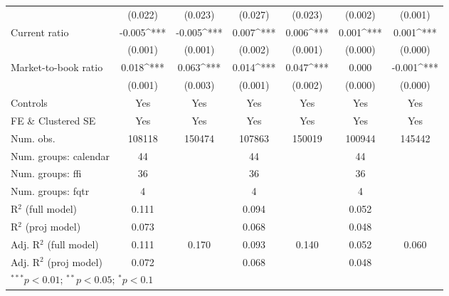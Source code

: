 \begin{sidewaystable}[h]
\begin{center}
{\begin{tabular}{l S[table-format=6.6] S[table-format=6.6] S[table-format=6.6] S[table-format=6.6] S[table-format=6.6] S[table-format=6.6]}
                                    & (0.022)      & (0.023)      & (0.027)      & (0.023)      & (0.002)      & (0.001)      \\
Current ratio                       & -0.005^{***} & -0.005^{***} & 0.007^{***}  & 0.006^{***}  & 0.001^{***}  & 0.001^{***}  \\
                                    & (0.001)      & (0.001)      & (0.002)      & (0.001)      & (0.000)      & (0.000)      \\
Market-to-book ratio                & 0.018^{***}  & 0.063^{***}  & 0.014^{***}  & 0.047^{***}  & 0.000        & -0.001^{***} \\
                                    & (0.001)      & (0.003)      & (0.001)      & (0.002)      & (0.000)      & (0.000)      \\
\midrule
Controls                            & {Yes}        & {Yes}        & {Yes}        & {Yes}        & {Yes}        & {Yes}        \\
FE \& Clustered SE                  & {Yes}        & {Yes}        & {Yes}        & {Yes}        & {Yes}        & {Yes}        \\
Num. obs.                           & 108118       & 150474       & 107863       & 150019       & 100944       & 145442       \\
Num. groups: calendar               & 44           &              & 44           &              & 44           &              \\
Num. groups: ffi                    & 36           &              & 36           &              & 36           &              \\
Num. groups: fqtr                   & 4            &              & 4            &              & 4            &              \\
R$^2$ (full model)                  & 0.111        &              & 0.094        &              & 0.052        &              \\
R$^2$ (proj model)                  & 0.073        &              & 0.068        &              & 0.048        &              \\
Adj. R$^2$ (full model)             & 0.111        & 0.170        & 0.093        & 0.140        & 0.052        & 0.060        \\
Adj. R$^2$ (proj model)             & 0.072        &              & 0.068        &              & 0.048        &              \\
\bottomrule
{}
\end{tabular}}
\label{regcompare}
\end{center}
\end{sidewaystable}
